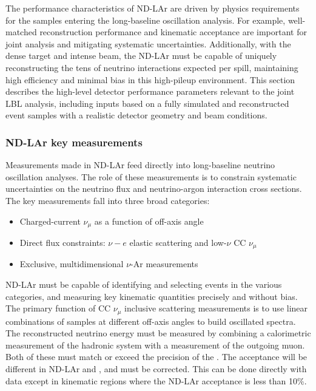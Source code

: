 The performance characteristics of ND-LAr are driven by physics requirements for the samples entering the long-baseline oscillation analysis. For example, well-matched reconstruction performance and kinematic acceptance are important for joint analysis and mitigating systematic uncertainties. Additionally, with the dense target and intense beam, the ND-LAr must be capable of uniquely reconstructing the tens of neutrino interactions expected per spill, maintaining high efficiency and minimal bias in this high-pileup environment. This section describes the high-level detector performance parameters relevant to the joint LBL analysis, including inputs based on a fully simulated and reconstructed event samples with a realistic detector geometry and beam conditions.

\subsubsection{ND-LAr key measurements}

Measurements made in ND-LAr feed directly into long-baseline neutrino oscillation analyses. The role of these measurements is to constrain systematic uncertainties on the neutrino flux and neutrino-argon interaction cross sections. The key measurements fall into three broad categories:

\begin{itemize}
    \item Charged-current $\nu_{\mu}$ as a function of off-axis angle
    \item Direct flux constraints: $\nu-e$ elastic scattering and low-$\nu$ CC $\nu_{\mu}$
    \item Exclusive, multidimensional $\nu$-Ar measurements
\end{itemize}

ND-LAr must be capable of identifying and selecting events in the various categories, and measuring key kinematic quantities precisely and without bias. The primary function of CC $\nu_{\mu}$ inclusive scattering measurements is to use linear combinations of samples at different off-axis angles to build oscillated  spectra. The reconstructed neutrino energy must be measured by combining a calorimetric measurement of the hadronic system with a measurement of the outgoing muon. Both of these must match or exceed the precision of the . The acceptance will be different in ND-LAr and , and must be corrected. This can be done directly with data except in kinematic regions where the ND-LAr acceptance is less than 10\%.

